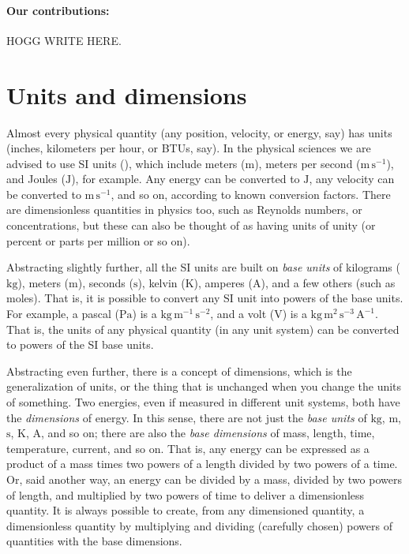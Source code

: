 \documentclass[12pt, letterpaper]{article}
\newcommand{\unit}[1]{\mathrm{#1}}
\newcommand{\kg}{\unit{kg}}
\newcommand{\m}{\unit{m}}
\newcommand{\s}{\unit{s}}
\newcommand{\K}{\unit{K}}
\newcommand{\A}{\unit{A}}
\newcommand{\J}{\unit{J}}
\newcommand{\Pa}{\unit{Pa}}
\newcommand{\V}{\unit{V}}
\begin{document}
\paragraph{Our contributions:}
HOGG WRITE HERE.

\section{Units and dimensions}

Almost every physical quantity (any position, velocity, or energy, say) has units (inches, kilometers per hour, or BTUs, say).
In the physical sciences we are advised to use SI units (\cite{si}), which include meters ($\m$), meters per second ($\m\,\s^{-1}$), and Joules ($\J$), for example.
Any energy can be converted to $\J$, any velocity can be converted to $\m\,\s^{-1}$, and so on, according to known conversion factors.
There are dimensionless quantities in physics too, such as Reynolds numbers, or concentrations, but these can also be thought of as having units of unity (or percent or parts per million or so on).

Abstracting slightly further, all the SI units are built on \emph{base units} of kilograms ($\kg$), meters ($\m$), seconds ($\s$), kelvin ($\K$), amperes ($\A$), and a few others (such as moles).
That is, it is possible to convert any SI unit into powers of the base units.
For example, a pascal ($\Pa$) is a $\kg\,\m^{-1}\,\s^{-2}$, and a volt ($\V$) is a $\kg\,\m^{2}\,\s^{-3}\,\A^{-1}$.
That is, the units of any physical quantity (in any unit system) can be converted to powers of the SI base units.

Abstracting even further, there is a concept of dimensions, which is the generalization of units, or the thing that is unchanged when you change the units of something.
Two energies, even if measured in different unit systems, both have the \emph{dimensions} of energy.
In this sense, there are not just the \emph{base units} of $\kg$, $\m$, $\s$, $\K$, $\A$, and so on; there are also the \emph{base dimensions} of mass, length, time, temperature, current, and so on.
That is, any energy can be expressed as a product of a mass times two powers of a length divided by two powers of a time.
Or, said another way, an energy can be divided by a mass, divided by two powers of length, and multiplied by two powers of time to deliver a dimensionless quantity.
It is always possible to create, from any dimensioned quantity, a dimensionless quantity by multiplying and dividing (carefully chosen) powers of quantities with the base dimensions.
\end{document}
